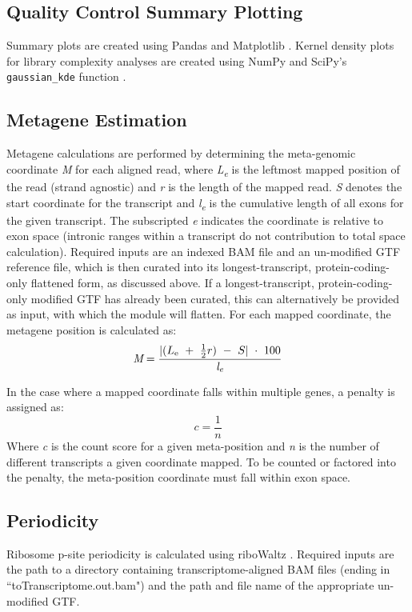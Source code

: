 \documentclass[10pt, oneside]{article}
\begin{document}
\subsection{Quality Control Summary Plotting}
Summary plots are created using Pandas \cite{pandas} and Matplotlib \cite{matplotlib}. Kernel density plots for library complexity analyses are created using NumPy \cite{numpy1, numpy2} and SciPy's \texttt{gaussian\_kde} function \cite{scipy}.

\subsection{Metagene Estimation}
Metagene calculations are performed by determining the meta-genomic coordinate \textit{M} for each aligned read, where \textit{L\textsubscript{e}} is the leftmost mapped position of the read (strand agnostic) and \textit{r} is the length of the mapped read. \textit{S} denotes the start coordinate for the transcript and \textit{l\textsubscript{e}} is the cumulative length of all exons for the given transcript. The subscripted \textit{e} indicates the coordinate is relative to exon space (intronic ranges within a transcript do not contribution to total space calculation). Required inputs are an indexed BAM file and an un-modified GTF reference file, which is then curated into its longest-transcript, protein-coding-only flattened form, as discussed above. If a longest-transcript, protein-coding-only modified GTF has already been curated, this can alternatively be provided as input, with which the module will flatten. For each mapped coordinate, the metagene position is calculated as:
\begin{equation}
\textit{M} = \frac{|(L\textsubscript{e}\ +\ \frac{1}{2}r)\ -\ S|\ \cdot\ 100}{\textit{l\textsubscript{e}}}
\end{equation}

In the case where a mapped coordinate falls within multiple genes, a penalty is assigned as:
\begin{equation}
  \textit{c} = \frac{1}{\textit{n}}
\end{equation}
Where \textit{c} is the count score for a given meta-position and \textit{n} is the number of different transcripts a given coordinate mapped. To be counted or factored into the penalty, the meta-position coordinate must fall within exon space.

\subsection{Periodicity}
Ribosome p-site periodicity is calculated using riboWaltz \cite{ribowaltz}. Required inputs are the path to a directory containing transcriptome-aligned BAM files (ending in ``toTranscriptome.out.bam") and the path and file name of the appropriate un-modified GTF.
\end{document}
